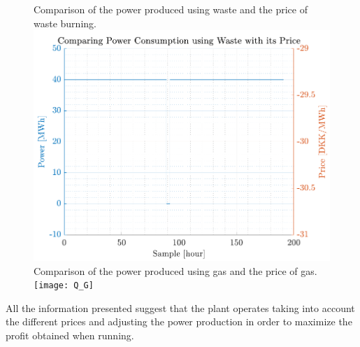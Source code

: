 \begin{figure}[H]
    \captionbox
    {       
        Comparison of the power produced using waste and the price of waste burning.          
        \label{fig:Q_W}                                  
    }                                                                 
    {                                                                  
        \includegraphics[height=.37\textwidth]{figures/Q_W} 
    }                                                                    
    \hspace{5pt}                                                          
    \captionbox  
    {          
        Comparison of the power produced using gas and the price of gas.                                                      
        \label{fig:Q_G}                                     
    }                                                                     
    {                                                                     
        \texttt{[image: Q\_G]}            
    }      
\end{figure}
All the information presented suggest that the plant operates taking into account the different prices and adjusting the power production in order to maximize the profit obtained when running.

